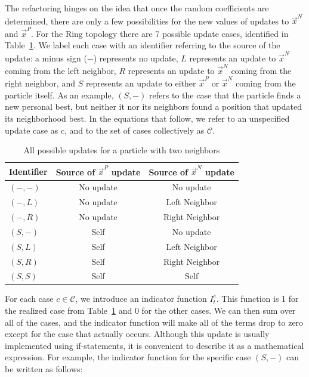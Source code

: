 \documentclass[journal,letterpaper]{IEEEtran}
\providecommand{\pers}{\ensuremath{P}}
\providecommand{\neigh}{\ensuremath{N}}
\providecommand{\leftind}{\ensuremath{L}}
\providecommand{\rightind}{\ensuremath{R}}
\providecommand{\nbest}{\ensuremath{\Vec{x}^\neigh}}
\providecommand{\pbest}{\ensuremath{\Vec{x}^\pers}}
\providecommand{\indic}{\ensuremath{I}}
\providecommand{\caseset}{\ensuremath{\mathcal{C}}}
\providecommand{\casegen}{\ensuremath{c}}
\providecommand{\casexn}{\ensuremath{(S,-)}}
\providecommand{\casexx}{\ensuremath{(S,S)}}
\providecommand{\casexl}{\ensuremath{(S,\leftind)}}
\providecommand{\casexr}{\ensuremath{(S,\rightind)}}
\providecommand{\casepn}{\ensuremath{(-,-)}}
\providecommand{\casepl}{\ensuremath{(-,\leftind)}}
\providecommand{\casepr}{\ensuremath{(-,\rightind)}}
\begin{document}
The refactoring hinges on the idea that once the random coefficients are
determined, there are only a few possibilities for the new values of updates
to $\nbest$ and $\pbest$.  For the Ring topology there are 7 possible update
cases, identified in Table~\ref{tab:evals}.  We label each case with an
identifier referring to the source of the update: a minus sign ($-$)
represents no update, $L$ represents an update to $\nbest$ coming from the
left neighbor, $R$ represents an update to $\nbest$ coming from the right
neighbor, and $S$ represents an update to either $\pbest$ or $\nbest$ coming
from the particle itself.  As an example, $\casexn$ refers to the case that
the particle finds a new personal best, but neither it nor its neighbors found
a position that updated its neighborhood best.  In the equations that follow,
we refer to an unspecified update case as $\casegen$, and to the set of cases
collectively as $\caseset$.

\begin{table}
  \caption{All possible updates for a particle with two neighbors}
  \label{tab:evals}
  \centering
  \begin{tabular}{lcc}
	Identifier&Source of $\pbest$ update&Source of $\nbest$ update\\
	\hline
	\hline
	$\casepn$&No update&No update\\
	\hline
	$\casepl$&No update&Left Neighbor\\
	\hline
	$\casepr$&No update&Right Neighbor\\
	\hline
	$\casexn$&Self&No update\\
	\hline
	$\casexl$&Self&Left Neighbor\\
	\hline
	$\casexr$&Self&Right Neighbor\\
	\hline
	$\casexx$&Self&Self\\
	\hline
  \end{tabular}
\end{table}

For each case $\casegen \in \caseset$, we introduce an indicator function
$\indic_{t}^{\casegen}$.  This function is 1 for the realized case from
Table~\ref{tab:evals} and 0 for the other cases.  We can then sum over all of
the cases, and the indicator function will make all of the terms drop to zero
except for the case that actually occurs.  Although this update is usually
implemented using if-statements, it is convenient to describe it as a
mathematical expression.  For example, the indicator function for the specific
case $\casexn$ can be written as follows:
\end{document}
